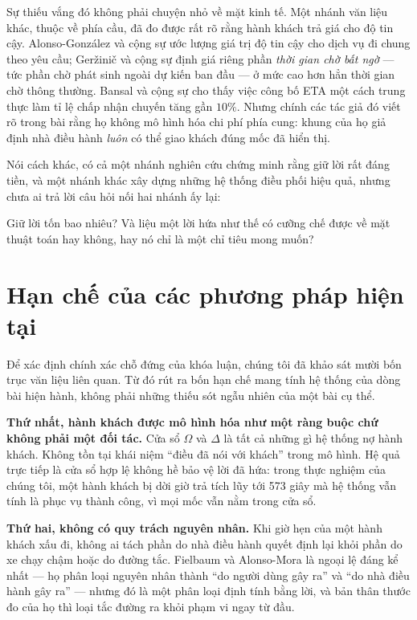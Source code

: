 Sự thiếu vắng đó không phải chuyện nhỏ về mặt kinh tế. Một nhánh văn liệu khác, thuộc về phía
cầu, đã đo được rất rõ rằng hành khách trả giá cho độ tin cậy. Alonso-González và cộng sự
\cite{alonsogonzalez2020} ước lượng giá trị độ tin cậy cho dịch vụ đi chung theo yêu cầu;
Geržinič và cộng sự \cite{gerzinic2023} định giá riêng phần \emph{thời gian chờ bất ngờ} ---
tức phần chờ phát sinh ngoài dự kiến ban đầu --- ở mức cao hơn hẳn thời gian chờ thông thường.
Bansal và cộng sự \cite{bansal2019} cho thấy việc công bố ETA một cách trung thực làm tỉ lệ
chấp nhận chuyến tăng gần $10\%$. Nhưng chính các tác giả đó viết rõ trong bài rằng họ không
mô hình hóa chi phí phía cung: khung của họ giả định nhà điều hành \emph{luôn} có thể giao
khách đúng mốc đã hiển thị.

Nói cách khác, có cả một nhánh nghiên cứu chứng minh rằng giữ lời rất đáng tiền, và một nhánh
khác xây dựng những hệ thống điều phối hiệu quả, nhưng chưa ai trả lời câu hỏi nối hai nhánh
ấy lại:

\begin{khungy}
Giữ lời tốn bao nhiêu? Và liệu một lời hứa như thế có cưỡng chế được về mặt thuật toán hay
không, hay nó chỉ là một chỉ tiêu mong muốn?
\end{khungy}

\section{Hạn chế của các phương pháp hiện tại}

Để xác định chính xác chỗ đứng của khóa luận, chúng tôi đã khảo sát mười bốn trục văn liệu liên
quan. Từ đó rút ra bốn hạn chế mang tính hệ thống của dòng bài hiện hành, không phải những
thiếu sót ngẫu nhiên của một bài cụ thể.

\textbf{Thứ nhất, hành khách được mô hình hóa như một ràng buộc chứ không phải một đối tác.}
Cửa sổ $\Omega$ và $\Delta$ là tất cả những gì hệ thống nợ hành khách. Không tồn tại khái niệm
``điều đã nói với khách'' trong mô hình. Hệ quả trực tiếp là cửa sổ hợp lệ không hề bảo vệ lời
đã hứa: trong thực nghiệm của chúng tôi, một hành khách bị dời giờ trả tích lũy tới 573 giây
mà hệ thống vẫn tính là phục vụ thành công, vì mọi mốc vẫn nằm trong cửa sổ.

\textbf{Thứ hai, không có quy trách nguyên nhân.} Khi giờ hẹn của một hành khách xấu đi, không
ai tách phần do nhà điều hành quyết định lại khỏi phần do xe chạy chậm hoặc do đường tắc.
Fielbaum và Alonso-Mora \cite{fielbaum2020} là ngoại lệ đáng kể nhất --- họ phân loại nguyên
nhân thành ``do người dùng gây ra'' và ``do nhà điều hành gây ra'' --- nhưng đó là một phân
loại định tính bằng lời, và bản thân thước đo của họ thì loại tắc đường ra khỏi phạm vi ngay
từ đầu.

